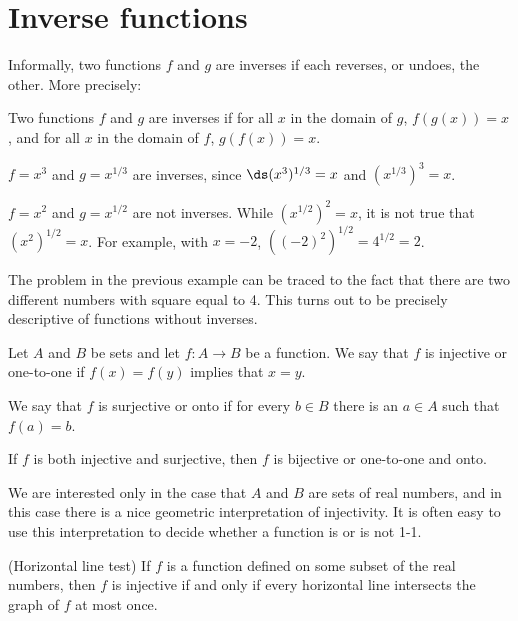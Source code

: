 \section{Inverse functions}{}{}
\label{sec:inverse functions}

Informally, two functions $f$ and $g$ are {\dfont inverses\/} if
each reverses, or undoes, the other. More precisely:

\begin{definition} Two functions $f$ and $g$ are inverses if for all $x$ in the
domain of $g$,
$f(g(x))=x$, and for all $x$ in the domain of $f$, $g(f(x))=x$.
\end{definition}

\begin{example} $f=x^3$ and $g=x^{1/3}$ are inverses, since
$\ds (x^3)^{1/3}=x$ and $(x^{1/3})^3=x$.
\end{example}

\begin{example} $f=x^2$ and $g=x^{1/2}$ are not inverses. While
$(x^{1/2})^2=x$, it is not true that $(x^2)^{1/2}=x$. For example,
with $x=-2$, $((-2)^2)^{1/2}=4^{1/2}=2$.
\end{example}

The problem in the previous example can be traced to the fact that
there are two different numbers with square equal to 4. This turns out
to be precisely descriptive of functions without inverses.

\begin{definition}
Let $A$ and  $B$  be sets and let $f:A\to B$ be a
function. We say that $f$ is {\dfont injective\/} or
{\dfont one-to-one\/} if $f(x)=f(y)$ implies that $x=y$.

We say that $f$ is {\dfont surjective\/} or {\dfont onto\/} if for
 every $b\in B$ there is an $a\in A$ such that $f(a)=b$. 

 If $f$ is both injective and surjective, then $f$ is
 {\dfont bijective\/} or {\dfont one-to-one and onto}. 

\end{definition}



We are interested only in the case that $A$ and $B$ are sets of real
numbers, and in this case there is a nice geometric interpretation of
injectivity. It is often easy to use this interpretation to decide
whether a function is or is not 1-1.

\begin{theorem} (Horizontal line test) If $f$ is a function defined on some
subset of the real numbers, then $f$ is injective if and only if 
every horizontal line intersects the graph of $f$ at most once.
\end{theorem}

